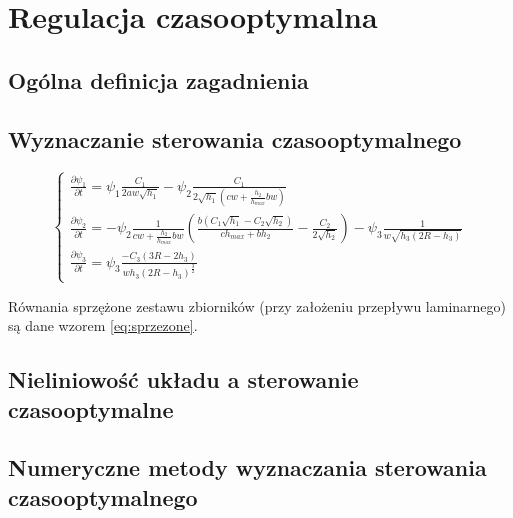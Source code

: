 \section{Regulacja czasooptymalna}
\label{sec:toc}

\subsection{Ogólna definicja zagadnienia}
\label{sub:toc-def}


\subsection{Wyznaczanie sterowania czasooptymalnego}
\label{sub:toc-ctrl}


\begin{equation}\label{eq:sprzezone}
	\left \{
	\begin{array}{lr}
		\frac{\partial \psi_{1}}{\partial t} =  \psi_{1}\frac{C_{1}}{2aw\sqrt{h_{1}}} - \psi_{2}\frac{C_{1}}{2\sqrt{h_{1}}(cw + \frac{h_{2}}{h_{max}}bw)} \\[20pt]
		\frac{\partial \psi_{2}}{\partial t} = - \psi_{2}\frac{1}{cw + \frac{h_{2}}{h_{max}}bw}(\frac{b(C_{1}\sqrt{h_{1}} - C_{2}\sqrt{h_{2}})}{ch_{max} + bh_{2}} - \frac{C_{2}}{2\sqrt{h_{2}}}) - \psi_{3}\frac{1}{w\sqrt{h_{3}(2R - h_{3})}} \\[20pt]
		\frac{\partial \psi_{3}}{\partial t} = \psi_{3}\frac{-C_{3}(3R - 2h_{3})}{wh_{3}(2R - h_{3})^{\frac{3}{2}}}
	\end{array}
	\right.
\end{equation}

Równania sprzężone zestawu zbiorników (przy założeniu przepływu laminarnego) są dane wzorem \ref{eq:sprzezone}.


\subsection{Nieliniowość układu a sterowanie czasooptymalne}
\label{sub:toc-nonlnr}


\subsection{Numeryczne metody wyznaczania sterowania czasooptymalnego}
\label{sub:toc-num}
